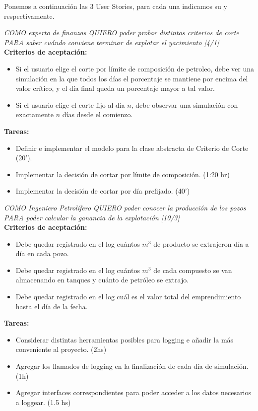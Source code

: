 Ponemos a continuación las 3 User Stories, para cada una indicamos su
\BV{} y \SP{} respectivamente.

\begin{tcolorbox}
\textit{COMO experto de finanzas QUIERO poder probar distintos criterios de corte PARA saber cuándo conviene terminar de explotar el yacimiento [4/1]}\\

\textbf{Criterios de aceptación:}
\begin{itemize}
	\item Si el usuario elige el corte por límite de composición de petroleo, debe ver una simulación en la que todos los días el porcentaje se mantiene por encima del valor crítico, y el día final queda un porcentaje mayor a tal valor.
    \item Si el usuario elige el corte fijo al día $n$, debe observar una simulación con exactamente $n$ días desde el comienzo.
\end{itemize}

\textbf{Tareas:}
\begin{itemize}
	\item Definir e implementar el modelo para la clase abstracta de
    Criterio de Corte (20').
    \item Implementar la decisión de cortar por límite de composición. (1:20 hr)
    \item Implementar la decisión de cortar por día prefijado. (40')
\end{itemize}
\end{tcolorbox}

\begin{tcolorbox}
\textit{COMO Ingeniero Petrolífero QUIERO poder conocer la producción de los pozos PARA poder calcular la ganancia de la explotación [10/3]}\\

\textbf{Criterios de aceptación:}
\begin{itemize}
	\item Debe quedar registrado en el log cuántos $m^3$ de producto se extrajeron día a día en cada pozo.
    \item Debe quedar registrado en el log cuántos $m^3$ de cada compuesto se van almacenando en tanques y cuánto de petróleo se extrajo.
    \item Debe quedar registrado en el log cuál es el valor total del emprendimiento hasta el día de la fecha.
\end{itemize}

\textbf{Tareas:}
\begin{itemize}
	\item Considerar distintas herramientas posibles para logging e añadir la más conveniente al proyecto. (2hs)
    \item Agregar los llamados de logging en la finalización de cada día de simulación. (1h)
    \item Agregar interfaces correspondientes para poder acceder a los datos necesarios a loggear. (1.5 hs)
\end{itemize}
\end{tcolorbox}

